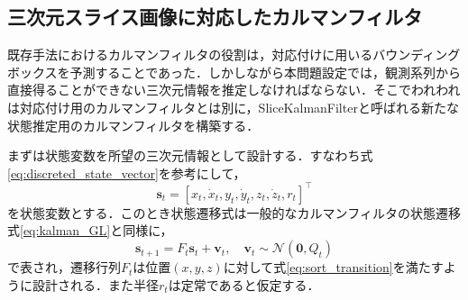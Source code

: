     \subsection{三次元スライス画像に対応したカルマンフィルタ}
    \label{subsec:sliced_kalman_filter}
    
    既存手法におけるカルマンフィルタの役割は，対応付けに用いるバウンディングボックスを予測することであった．しかしながら本問題設定では，観測系列から直接得ることができない三次元情報を推定しなければならない．そこでわれわれは対応付け用のカルマンフィルタとは別に，SliceKalmanFilterと呼ばれる新たな状態推定用のカルマンフィルタを構築する．
    
    まずは状態変数を所望の三次元情報として設計する．すなわち式\ref{eq:discreted_state_vector}を参考にして，
    \begin{equation}
        \label{eq:skf_state_vector}
        \bm{s}_t = \left[x_t, \dot{x}_t, y_t, \dot{y}_t, z_t, \dot{z}_t, r_t\right]^{\top}
    \end{equation}
    を状態変数とする．このとき状態遷移式は一般的なカルマンフィルタの状態遷移式\ref{eq:kalman_GL}と同様に，
    \begin{equation}
        \label{eq:skf_state_transition}
        \bm{s}_{t+1} = F_t \bm{s}_t + \bm{v}_t, \quad \bm{v}_t \sim \mathcal{N}(\bm{0}, Q_t)
    \end{equation}
    で表され，遷移行列$F_t$は位置$(x,y,z)$に対して式\ref{eq:sort_transition}を満たすように設計される．また半径$r_t$は定常であると仮定する．

